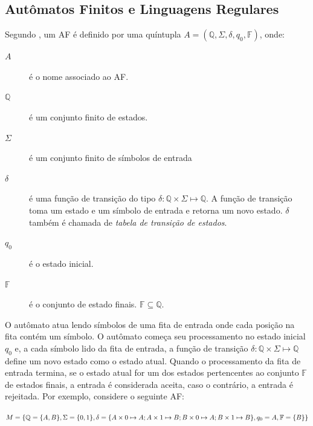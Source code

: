 \documentclass[12pt,a4paper]{article}
\begin{document}
\subsection{Autômatos Finitos e Linguagens Regulares}

Segundo , um AF é definido por
uma quíntupla $A = (\mathbb{Q},\Sigma,\delta,q_0,\mathbb{F})$, onde:

\begin{description}
\item[$A$] é o nome associado ao AF.
\item[$\mathbb{Q}$] é um conjunto finito de estados.
\item[$\Sigma$] é um conjunto finito de símbolos de entrada
\item[$\delta$] é uma função de transição do tipo $\delta: \mathbb{Q} \times \Sigma \mapsto \mathbb{Q}$.
A função de transição toma um estado e um símbolo de entrada e retorna um novo estado.
$\delta$ também é chamada de \textit{tabela de transição de estados}.
\item[$q_0$] é o estado inicial.
\item[$\mathbb{F}$] é o conjunto de estado finais. $\mathbb{F} \subseteq \mathbb{Q}$.
\end{description}

O autômato atua lendo símbolos de uma fita de entrada onde cada posição na fita
contém um símbolo. O autômato começa seu processamento no estado inicial $q_0$ e,
a cada símbolo lido da fita de entrada, a função de transição
$\delta: \mathbb{Q} \times \Sigma \mapsto \mathbb{Q}$ define um novo estado como o estado atual.
Quando o processamento da fita de entrada termina, se o estado atual for
um dos estados pertencentes ao conjunto $\mathbb{F}$ de estados finais, a entrada é
considerada aceita, caso o contrário, a entrada é rejeitada. Por exemplo,
considere o seguinte AF:

\begin{center}
$M = \{ \mathbb{Q} = \{A,B\}, \break \Sigma = \{0,1\}, \break
\delta = \{A \times 0 \mapsto A; A \times 1 \mapsto B; B \times 0 \mapsto A; B \times 1 \mapsto B\}, \break
q_0 = A, \break \mathbb{F} = \{B\} \}$
\end{center}
\end{document}
